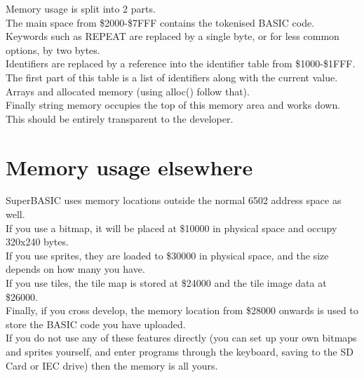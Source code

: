 Memory usage is split into 2 parts. \\

The main space from \$2000-\$7FFF contains the tokenised BASIC code. Keywords such as REPEAT are replaced by a single byte, or for less common options, by two bytes.\\ 

Identifiers are replaced by a reference into the identifier table from \$1000-\$1FFF. The first part of this table is a list of identifiers along with the current value.\\

Arrays and allocated memory (using alloc() follow that).\\

Finally string memory occupies the top of this memory area and works down.\\

This should be entirely transparent to the developer.

\section{Memory usage elsewhere}

SuperBASIC uses memory locations outside the normal 6502 address space as well. \\

If you use a bitmap, it will be placed at \$10000 in physical space and occupy 320x240 bytes.\\

If you use sprites, they are loaded to \$30000 in physical space, and the size depends on how many you have.\\

If you use tiles, the tile map is stored at \$24000 and the tile image data at \$26000. \\

Finally, if you cross develop, the memory location from \$28000 onwards is used to store the BASIC code you have uploaded.\\

If you do not use any of these features directly (you can set up your own bitmaps and sprites yourself, and enter programs through the keyboard, saving to the SD Card or IEC drive) then the memory is all yours.
